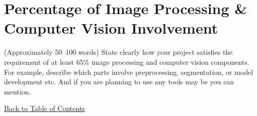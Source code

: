 \section{Percentage of Image Processing \& Computer Vision Involvement}
(Approximately 50–100 words)
State clearly how your project satisfies the requirement of at least 65\% image processing and computer vision components.  
For example, describe which parts involve preprocessing, segmentation, or model development etc. And if you are planning to use any tools may be you can mention.

\hyperref[contents]{\small Back to Table of Contents}
\newpage
